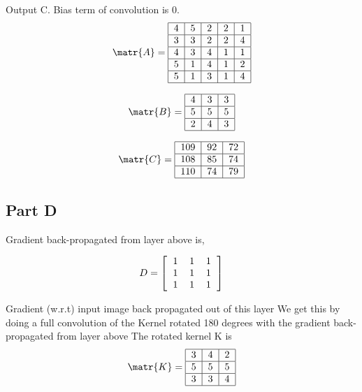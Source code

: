 \documentclass{article}
\begin{document}
Output C. Bias term of convolution is 0.
\[
\matr{A} =  \begin{tabular}{|c|c|c|c|c|} 
    \hline
       4 & 5 & 2 & 2 & 1 \\ \hline 
       3 & 3 & 2 & 2 & 4 \\ \hline
       4 & 3 & 4 & 1 & 1 \\ \hline 
       5 & 1 & 4 & 1 & 2 \\ \hline
       5 & 1 & 3 & 1 & 4 \\ \hline
    \end{tabular}
\]

\[
\matr{B} = \begin{tabular}{|c|c|c|} 
    \hline
       4 & 3 & 3 \\ \hline 
       5 & 5 & 5 \\ \hline
       2 & 4 & 3 \\ \hline 
    \end{tabular}
\]

\[
\matr{C} =  \begin{tabular}{|c|c|c|} 
    \hline
       109 & 92 & 72 \\ \hline 
       108 & 85 & 74 \\ \hline
       110 & 74 & 79 \\ \hline 
    \end{tabular}
\]
\subsection*{Part D} 

Gradient back-propagated from layer above is, 

\[
D =
\left[
\begin{tabular}{ccc}
1 & 1 & 1 \\
1 & 1 & 1 \\
1 & 1 & 1 \\
\end{tabular}
\right]
\]

Gradient (w.r.t) input image back propagated out of this layer 
We get this by doing a full convolution of the Kernel rotated 180 degrees with the gradient back-propagated from layer above
The rotated kernel K is \\
\[
\matr{K} = \begin{tabular}{|c|c|c|} 
    \hline
       3 & 4 & 2 \\ \hline 
       5 & 5 & 5 \\ \hline
       3 & 3 & 4 \\ \hline 
    \end{tabular}\\
\]
\end{document}
